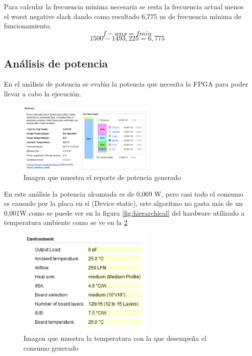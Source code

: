 	Para calcular la frecuencia mínima necesaria se resta la frecuencia actual menos el worst negative slack dando como resultado 6,775 ns de frecuencia mínima de funcionamiento.  
	\[f - wns = f{min}\]
	\[1500 - 1493,225 = 6,775\]

	

\subsection{Análisis de potencia}

	En el análisis de potencia se evalúa la potencia que necesita la FPGA para poder llevar a cabo la ejecución.

	\begin{figure}[h!]
		\centering
		\includegraphics[width=0.6\textwidth]{./Images/img_res_experimentales/reportepower.png}
		\caption{Imagen que muestra el reporte de potencia generado}
		\label{fig:reportepotencia}
	\end{figure} 

	En este análisis la potencia alcanzada es de 0,069 W, pero casi todo el consumo es causado por la placa en sí (Device static), este algoritmo no gasta más de un 0,001W como se puede ver en la figura \cref*{fig:hierarchical} del hardware utilizado a temperatura ambiente como se ve en la \cref*{fig:temperaturaambiente}

	\begin{figure}[h!]
		\centering
		\includegraphics[width=0.6\textwidth]{./Images/img_res_experimentales/temperaturaambientereportepower.png}
		\caption{Imagen que muestra la temperatura con la que desempeña el consumo generado}
		\label{fig:temperaturaambiente}
	\end{figure} 

